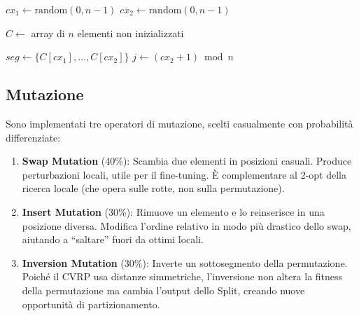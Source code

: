 \begin{algorithm}[H]
\footnotesize
\caption{Order Crossover (OX) \cite{davis1985applying}}
\label{alg:ox}

$cx_1 \gets \text{random}(0, n-1)$\;
$cx_2 \gets \text{random}(0, n-1)$\;

$C \gets$ array di $n$ elementi non inizializzati\;

$\mathit{seg} \gets \{C[cx_1], \dots, C[cx_2]\}$\; 
$j \gets (cx_2 + 1) \bmod n$\;
\;
\end{algorithm}

\subsection{Mutazione}

Sono implementati tre operatori di mutazione, scelti casualmente con probabilit\`a
differenziate:
\begin{enumerate}[label=\textbf{\arabic*.}]
    \item \textbf{Swap Mutation} (40\%): Scambia due elementi in posizioni casuali.
          Produce perturbazioni locali, utile per il fine-tuning. \`E complementare
          al 2-opt della ricerca locale (che opera sulle rotte, non sulla permutazione).
    \item \textbf{Insert Mutation} (30\%): Rimuove un elemento e lo reinserisce in
          una posizione diversa. Modifica l'ordine relativo in modo pi\`u drastico
          dello swap, aiutando a ``saltare'' fuori da ottimi locali.
    \item \textbf{Inversion Mutation} (30\%): Inverte un sottosegmento della
          permutazione. Poich\'e il CVRP usa distanze simmetriche, l'inversione
          non altera la fitness della permutazione ma cambia l'output dello Split,
          creando nuove opportunit\`a di partizionamento.
\end{enumerate}

